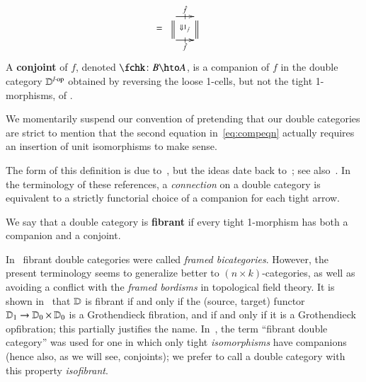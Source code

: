 \begin{defn}
\begin{align}
\begin{array}{c}
    \end{array} &=
    \begin{array}{c}
      \xymatrix@-.5pc{
        \ar[r]|-@{|}^-{\fhat} \ar@{=}[d] \ar@{}[dr]|{\Downarrow 1_{\fhat}}
        & \ar@{=}[d]\\
        \ar[r]|-@{|}_-{\fhat} & }
    \end{array}
  \end{align}
  A \textbf{conjoint} of $f$, denoted $\fchk\maps B\hto A$, is a
  companion of $f$ in the double category $\mathbb{D}^{l\cdot\mathrm{op}}$
  obtained by reversing the loose 1-cells, but not the tight
  1-morphisms, of \lD.
\end{defn}

\begin{rmk}
  We momentarily suspend our convention of pretending that our double
  categories are strict to mention that the second
  equation in~\eqref{eq:compeqn} actually requires an insertion of unit
  isomorphisms to make sense.
\end{rmk}

The form of this definition is due
to~\cite{gp:double-adjoints,dpp:spans}, but the ideas date back
to~\cite{bs:dblgpd-xedmod}; see
also~\cite{bm:dbl-thin-conn,fiore:pscat}.  In the terminology of these
references, a \emph{connection} on a double category is equivalent to
a strictly functorial choice of a companion for each tight arrow.

\begin{defn}
  We say that a double category is \textbf{fibrant} if every tight
  1-morphism has both a companion and a conjoint.
\end{defn}



\begin{rmk}
  In~\cite{shulman:frbi} fibrant double categories were called
  \emph{framed bicategories}.  However, the present terminology seems
  to generalize better to $(n\times k)$-categories, as well as
  avoiding a conflict with the \emph{framed bordisms} in topological
  field theory.
  It is shown in~\cite{shulman:frbi} that $\mathbb{D}$ is fibrant if and only if the (source, target) functor $\mathbb{D}_1 \to \mathbb{D}_0\times\mathbb{D}_0$ is a Grothendieck fibration, and if and only if it is a Grothendieck opfibration; this partially justifies the name.
  In~\cite{gg:ldstr-tricat}, the term ``fibrant double category'' was used for one in which only tight \emph{isomorphisms} have companions (hence also, as we will see, conjoints); we prefer to call a double category with this property \emph{isofibrant}.
\end{rmk}

